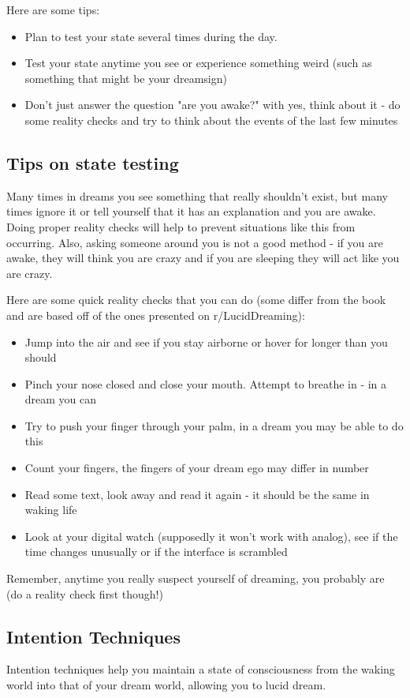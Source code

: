 \documentclass{article}
\begin{document}
Here are some tips:
\begin{itemize}
  \item Plan to test your state several times during the day.
  \item Test your state anytime you see or experience something weird (such as something that might be your dreamsign)
  \item Don't just answer the question "are you awake?" with yes, think about it - do some reality checks and try to think about the events of the last few minutes
\end{itemize}

\subsection{Tips on state testing}
Many times in dreams you see something that really shouldn't exist, but many times ignore it or tell yourself that it has an explanation and you are awake. Doing proper reality checks will help to prevent situations like this from occurring. Also, asking someone around you is not a good method - if you are awake, they will think you are crazy and if you are sleeping they will act like you are crazy.

Here are some quick reality checks that you can do (some differ from the book and are based off of the ones presented on r/LucidDreaming):
\begin{itemize}
  \item Jump into the air and see if you stay airborne or hover for longer than you should
  \item Pinch your nose closed and close your mouth. Attempt to breathe in - in a dream you can
  \item Try to push your finger through your palm, in a dream you may be able to do this
  \item Count your fingers, the fingers of your dream ego may differ in number
  \item Read some text, look away and read it again - it should be the same in waking life
  \item Look at your digital watch (supposedly it won't work with analog), see if the time changes unusually or if the interface is scrambled
\end{itemize}

Remember, anytime you really suspect yourself of dreaming, you probably are (do a reality check first though!)

\subsection{Intention Techniques}
Intention techniques help you maintain a state of consciousness from the waking world into that of your dream world, allowing you to lucid dream.
\end{document}
